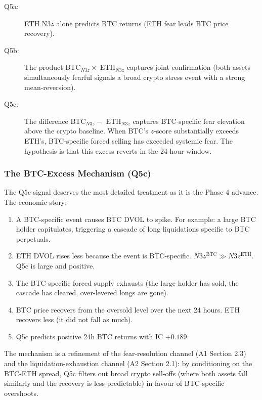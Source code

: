 \documentclass[12pt, a4paper]{article}
\theoremstyle{plain}
\theoremstyle{definition}
\begin{document}
\begin{description}
  \item[Q5a:] ETH N3$z$ alone predicts BTC returns (ETH fear leads BTC
        price recovery).
  \item[Q5b:] The product BTC$_{N3z} \times$ ETH$_{N3z}$ captures joint
        confirmation (both assets simultaneously fearful signals a broad
        crypto stress event with a strong mean-reversion).
  \item[Q5c:] The difference BTC$_{N3z} -$ ETH$_{N3z}$ captures
        BTC-specific fear elevation above the crypto baseline.  When BTC's
        $z$-score substantially exceeds ETH's, BTC-specific forced selling
        has exceeded systemic fear.  The hypothesis is that this excess
        reverts in the 24-hour window.
\end{description}

\subsubsection{The BTC-Excess Mechanism (Q5c)}

The Q5c signal deserves the most detailed treatment as it is the Phase 4
advance.  The economic story:

\begin{enumerate}
  \item A BTC-specific event causes BTC DVOL to spike.  For example:
        a large BTC holder capitulates, triggering a cascade of long
        liquidations specific to BTC perpetuals.
  \item ETH DVOL rises less because the event is BTC-specific.
        $N3z^{\mathrm{BTC}} \gg N3z^{\mathrm{ETH}}$.  Q5c is large and positive.
  \item The BTC-specific forced supply exhausts (the large holder
        has sold, the cascade has cleared, over-levered longs are gone).
  \item BTC price recovers from the oversold level over the next 24 hours.
        ETH recovers less (it did not fall as much).
  \item Q5c predicts positive 24h BTC returns with IC $+0.189$.
\end{enumerate}

The mechanism is a refinement of the fear-resolution channel (A1 Section
2.3) and the liquidation-exhaustion channel (A2 Section 2.1): by
conditioning on the BTC-ETH spread, Q5c filters out broad crypto sell-offs
(where both assets fall similarly and the recovery is less predictable)
in favour of BTC-specific overshoots.
\end{document}

